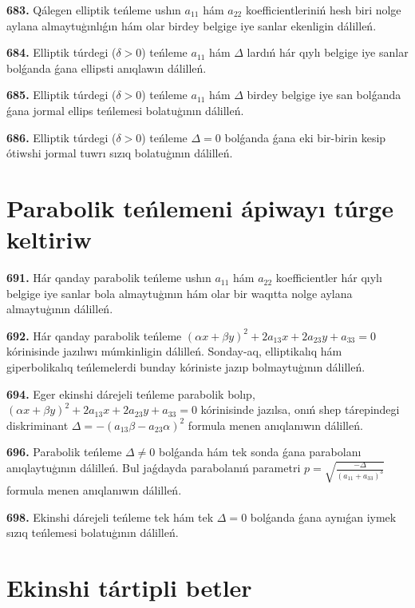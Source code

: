 \textbf{683.} Qálegen elliptik teńleme ushın $a_{11}$ hám $a_{22}$ koefficientleriniń hesh biri nolge aylana almaytuģınlıǵın hám olar birdey belgige iye sanlar ekenligin dálilleń.

\textbf{684.} Elliptik túrdegi ($\delta>0$) teńleme $a_{11}$ hám $\Delta$ lardıń hár qıylı belgige iye sanlar bolǵanda ǵana ellipsti anıqlawın dálilleń.

\textbf{685.} Elliptik túrdegi ($\delta>0$) teńleme $a_{11}$ hám $\Delta$ birdey belgige iye san bolǵanda ǵana jormal ellips teńlemesi bolatuģının dálilleń.

\textbf{686.} Elliptik túrdegi ($\delta>0$) teńleme $\Delta=0$ bolǵanda ǵana eki bir-birin kesip ótiwshi jormal tuwrı sızıq bolatuģının dálilleń.


\section{Parabolik teńlemeni ápiwayı túrge keltiriw}


\textbf{691.} Hár qanday parabolik teńleme ushın $a_{11}$ hám $a_{22}$ koefficientler hár qıylı belgige iye sanlar bola almaytuģının hám olar bir waqıtta nolge aylana almaytuģının dálilleń.

\textbf{692.} Hár qanday parabolik teńleme $ (\alpha x+\beta y) ^2+2a_{13}x+2a_{23}y+a_{33}=0$ kórinisinde jazılıwı múmkinligin dálilleń. Sonday-aq, elliptikalıq hám giperbolikalıq teńlemelerdi bunday kóriniste jazıp bolmaytuģının dálilleń.

\textbf{694.} Eger ekinshi dárejeli teńleme parabolik bolıp, $ (\alpha x+\beta y) ^2+2a_{13}x+2a_{23}y+a_{33}=0$ kórinisinde jazılsa, onıń shep tárepindegi diskriminant $\Delta=- (a_{13} \beta-a_{23} \alpha) ^2$ formula menen anıqlanıwın dálilleń.

\textbf{696.} Parabolik teńleme $\Delta \neq 0$ bolǵanda hám tek sonda ǵana parabolanı anıqlaytuģının dálilleń. Bul jaǵdayda parabolanıń parametri $p=\sqrt{\frac{-\Delta}{ (a_{11}+a_{33}) ^3}}$ formula menen anıqlanıwın dálilleń.

\textbf{698.} Ekinshi dárejeli teńleme tek hám tek $\Delta=0$ bolǵanda ǵana aynıǵan iymek sızıq teńlemesi bolatuģının dálilleń.



\section{ Ekinshi tártipli betler}



